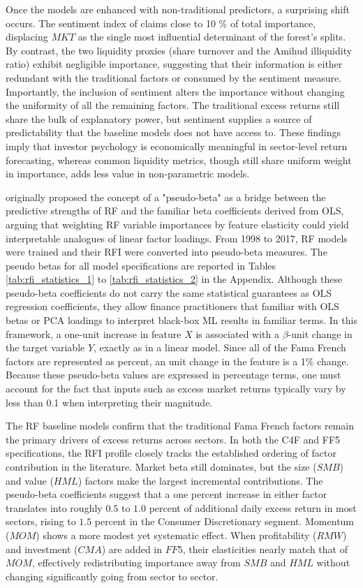 Once the models are enhanced with non-traditional predictors, a surprising shift occurs. The sentiment index of  claims close to 10 \% of total importance, displacing $MKT$ as the single most influential determinant of the forest's splits. By contrast, the two liquidity proxies (share turnover and the Amihud illiquidity ratio) exhibit negligible importance, suggesting that their information is either redundant with the traditional factors or consumed by the sentiment measure. Importantly, the inclusion of sentiment alters the importance without changing the uniformity of all the remaining factors. The traditional excess returns still share the bulk of explanatory power, but sentiment supplies a source of predictability that the baseline models does not have access to. These findings imply that investor psychology is economically meaningful in sector-level return forecasting, whereas common liquidity metrics, though still share uniform weight in importance, adds less value in non-parametric models.

 originally proposed the concept of a "pseudo-beta" as a bridge between the predictive strengths of RF and the familiar beta coefficients derived from OLS, arguing that weighting RF variable importances by feature elasticity could yield interpretable analogues of linear factor loadings. From 1998 to 2017, RF models were trained and their RFI were converted into pseudo-beta measures. The pseudo betas for all model specifications are reported in Tables \ref{tab:rfi_statistics_1} to \ref{tab:rfi_statistics_2} in the Appendix. Although these pseudo-beta coefficients do not carry the same statistical guarantees as OLS regression coefficients, they allow finance practitioners that familiar with OLS betas or PCA loadings to interpret black-box ML results in familiar terms. In this framework, a one-unit increase in feature $X$ is associated with a $\beta$-unit change in the target variable $Y$, exactly as in a linear model. Since all of the Fama French factors are represented as percent, an unit change in the feature is a 1\% change. Because these pseudo-beta values are expressed in percentage terms, one must account for the fact that inputs such as excess market returns typically vary by less than 0.1 when interpreting their magnitude.


The RF baseline models confirm that the traditional Fama French factors remain the primary drivers of excess returns across sectors. In both the C4F and FF5 specifications, the RFI profile closely tracks the established ordering of factor contribution in the literature. Market beta still dominates, but the size ($SMB$) and value ($HML$) factors make the largest incremental contributions. The pseudo-beta coefficients suggest that a one percent increase in either factor translates into roughly $0.5$ to $1.0$ percent of additional daily excess return in most sectors, rising to $1.5$ percent in the Consumer Discretionary segment. Momentum ($MOM$) shows a more modest yet systematic effect. When profitability ($RMW$) and investment ($CMA$) are added in $FF5$, their elasticities nearly match that of $MOM$, effectively redistributing importance away from $SMB$ and $HML$ without changing significantly going from sector to sector.

